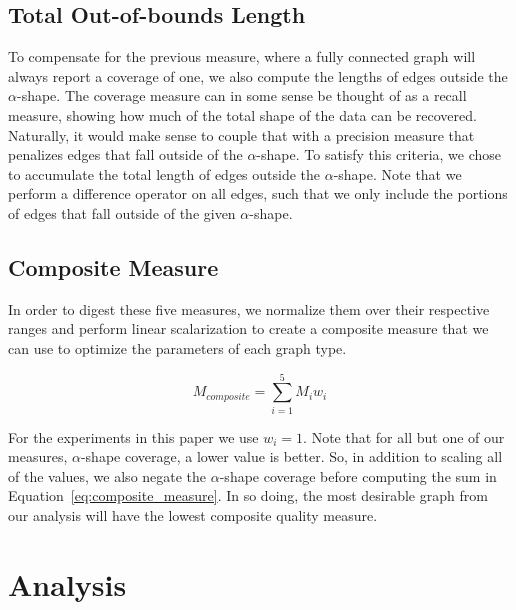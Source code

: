 \subsection{Total Out-of-bounds Length}
%
To compensate for the previous measure, where a fully connected graph will always report a coverage of one, we also compute the lengths of edges outside the $\alpha$-shape.
%
%
The coverage measure can in some sense be thought of as a recall measure, showing how much of the total shape of the data can be recovered.
%
Naturally, it would make sense to couple that with a precision measure that penalizes edges that fall outside of the $\alpha$-shape.
%
To satisfy this criteria, we chose to accumulate the total length of edges outside the $\alpha$-shape.
%
Note that we perform a difference operator on all edges, such that we only include the portions of edges that fall outside of the given $\alpha$-shape.

\subsection{Composite Measure}
In order to digest these five measures, we normalize them over their respective ranges and perform linear scalarization to create a composite measure that we can use to optimize the parameters of each graph type.

\begin{equation}
    M_{composite} = \sum_{i=1}^5 M_iw_i
\label{eq:composite_measure}
\end{equation}

For the experiments in this paper we use $w_i=1$.
%
Note that for all but one of our measures, $\alpha$-shape coverage, a lower value is better.
%
So, in addition to scaling all of the values, we also negate the $\alpha$-shape coverage before computing the sum in Equation~\ref{eq:composite_measure}.
%
In so doing, the most desirable graph from our analysis will have the lowest composite quality measure.

\section{Analysis}

